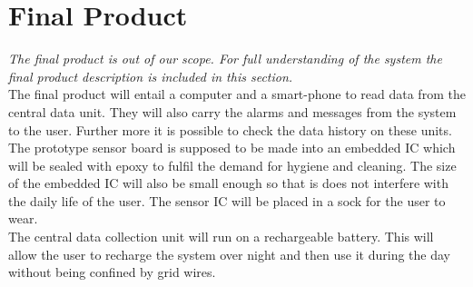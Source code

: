 \section{Final Product}
\textit{The final product is out of our scope. For full understanding of the system the final product description is included in this section.}\\

The final product will entail a computer and a smart-phone to read data from the central data unit. They will also carry the alarms and messages from the system to the user. Further more it is possible to check the data history on these units. \\

The prototype sensor board is supposed to be made into an embedded IC which will be sealed with epoxy to fulfil the demand for hygiene and cleaning. The size of the embedded IC will also be small enough so that is does not interfere with the daily life of the user. The sensor IC will be placed in a sock for the user to wear. \\

The central data collection unit will run on a rechargeable battery. This will allow the user to recharge the system over night and then use it during the day without being confined by grid wires.\\